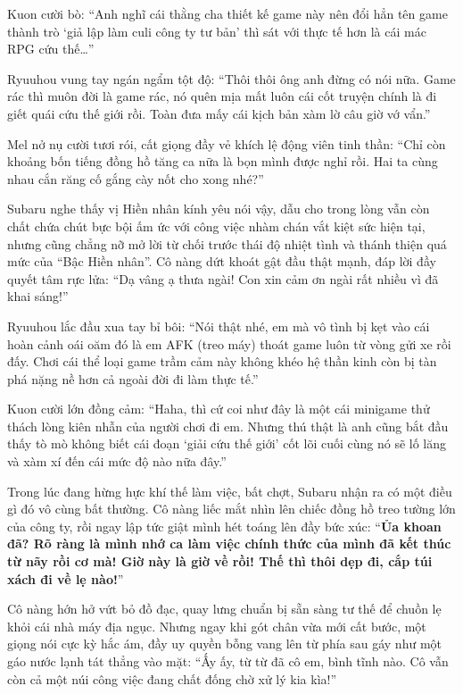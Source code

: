 \documentclass[../main.tex]{subfiles}
\begin{document}
\il

Kuon cười bò: ``Anh nghĩ cái thằng cha thiết kế game này nên đổi hẳn tên game thành trò `giả lập làm culi công ty tư bản' thì sát với thực tế hơn là cái mác RPG cứu thế\dots''

Ryuuhou vung tay ngán ngẩm tột độ: ``Thôi thôi ông anh đừng có nói nữa. Game rác thì muôn đời là game rác, nó quên mịa mất luôn cái cốt truyện chính là đi giết quái cứu thế giới rồi. Toàn đưa mấy cái kịch bản xàm lờ câu giờ vớ vẩn.''

\il

Mel nở nụ cười tươi rói, cất giọng đầy vẻ khích lệ động viên tinh thần: ``Chỉ còn khoảng bốn tiếng đồng hồ tăng ca nữa là bọn mình được nghỉ rồi. Hai ta cùng nhau cắn răng cố gắng cày nốt cho xong nhé?''

Subaru nghe thấy vị Hiền nhân kính yêu nói vậy, dẫu cho trong lòng vẫn còn chất chứa chút bực bội ấm ức với công việc nhàm chán vắt kiệt sức hiện tại, nhưng cũng chẳng nỡ mở lời từ chối trước thái độ nhiệt tình và thánh thiện quá mức của ``Bậc Hiền nhân''. Cô nàng dứt khoát gật đầu thật mạnh, đáp lời đầy quyết tâm rực lửa: ``Dạ vâng ạ thưa ngài! Con xin cảm ơn ngài rất nhiều vì đã khai sáng!''

\il

Ryuuhou lắc đầu xua tay bỉ bôi: ``Nói thật nhé, em mà vô tình bị kẹt vào cái hoàn cảnh oái oăm đó là em AFK (treo máy) thoát  game luôn từ vòng gửi xe rồi đấy. Chơi cái thể loại game trầm cảm này không khéo hệ thần kinh còn bị tàn phá nặng nề hơn cả ngoài đời đi làm thực tế.''

Kuon cười lớn đồng cảm: ``Haha, thì cứ coi như đây là một cái minigame thử thách lòng kiên nhẫn của người chơi đi em. Nhưng thú thật là anh cũng bắt đầu thấy tò mò không biết cái đoạn `giải cứu thế giới' cốt lõi cuối cùng nó sẽ lố lăng và xàm xí đến cái mức độ nào nữa đây.''

\il

Trong lúc đang hừng hực khí thế làm việc, bất chợt, Subaru nhận ra có một điều gì đó vô cùng bất thường. Cô nàng liếc mắt nhìn lên chiếc đồng hồ treo tường lớn của công ty, rồi ngay lập tức giật mình hét toáng lên đầy bức xúc: ``\textbf{Ủa khoan đã? Rõ ràng là mình nhớ ca làm việc chính thức của mình đã kết thúc từ nãy rồi cơ mà! Giờ này là giờ về rồi! Thế thì thôi dẹp đi, cắp túi xách đi về lẹ nào!}''

Cô nàng hớn hở vứt bỏ đồ đạc, quay lưng chuẩn bị sẵn sàng tư thế để chuồn lẹ khỏi cái nhà máy địa ngục. Nhưng ngay khi gót chân vừa mới cất bước, một giọng nói cực kỳ hắc ám, đầy uy quyền bỗng vang lên từ phía sau gáy như một gáo nước lạnh tát thẳng vào mặt: ``Ấy ấy, từ từ đã cô em, bình tĩnh nào. Cô vẫn còn cả một núi công việc đang chất đống chờ xử lý kia kìa!''
\end{document}
